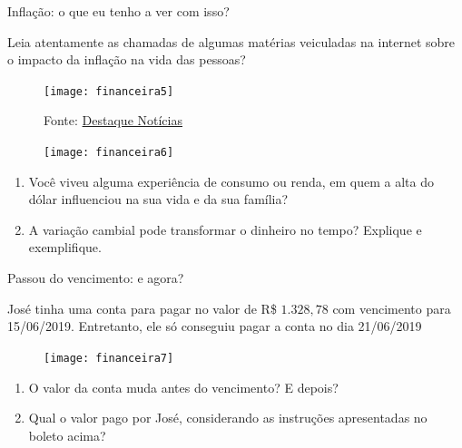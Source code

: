 \begin{task}{Inflação: o que eu tenho a ver com isso?}
\label{fin-ativ-13}

Leia atentamente as chamadas de algumas matérias veiculadas na internet sobre o impacto da inflação na vida das pessoas?

\begin{figure}[H]
\centering

\texttt{[image: financeira5]}

\caption{Fonte: \href{https://www.destaquenoticias.com.br/panificadores-de-sergipe-prometem-reajustar-preco-do-pao/}{Destaque Notícias}}
\end{figure}

\begin{figure}[H]
\centering

\texttt{[image: financeira6]}
\end{figure}
\begin{enumerate}
  \item Você viveu alguma experiência de consumo ou renda, em quem a alta do dólar influenciou na sua vida e da sua família?
  \item A variação cambial pode transformar o dinheiro no tempo? Explique e exemplifique.
\end{enumerate}
\end{task}
\needspace{.1\textheight}
\begin{task}{Passou do vencimento: e agora?}
\label{fin-ativ-14}

José tinha uma conta para pagar no valor de R\$ $1.328{,}78$ com vencimento para 15/06/2019. Entretanto, ele só conseguiu pagar a conta no dia 21/06/2019

\begin{figure}[H]
\centering

\texttt{[image: financeira7]}
\end{figure}

\begin{enumerate}
  \item O valor da conta muda antes do vencimento? E depois?
  \item Qual o valor pago por José, considerando as instruções apresentadas no boleto acima?
\end{enumerate}
\end{task}

